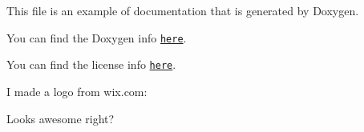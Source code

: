 This file is an example of documentation that is generated by Doxygen.

You can find the Doxygen info \href{http://www.stack.nl/~dimitri/doxygen/index.html}{\tt here}.

You can find the license info \href{https://choosealicense.com/}{\tt here}.

I made a logo from wix.\+com\+: 

Looks awesome right? 